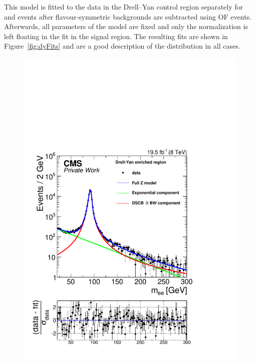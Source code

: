 This model is fitted to the data in the Drell--Yan control region separately for \EE and \MM events after flavour-symmetric backgrounds are subtracted using OF events. Afterwards, all parameters of the model are fixed and only the normalization is left floating in the fit in the signal region. The resulting fits are shown in Figure~\ref{fig:dyFits} and are a good description of the distribution in all cases. 

\begin{figure}[htbp]
\centering
\begin{minipage}[t]{0.49\textwidth}
  \includegraphics[width=\textwidth]{plots/results/fit/expoFitEE_Log_Central.pdf}
\end{minipage}
\begin{minipage}[t]{0.49\textwidth}

\end{minipage}
\end{figure}
